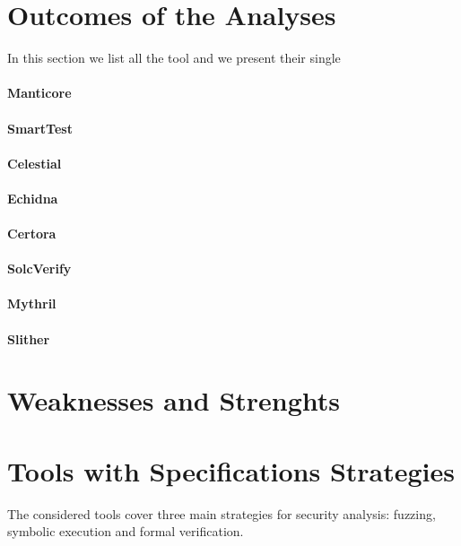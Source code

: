 \section{Outcomes of the Analyses}
In this section we list all the tool and we present their single 


\paragraph{Manticore} 
\paragraph{SmartTest}
\paragraph{Celestial}
\paragraph{Echidna}
\paragraph{Certora}
\paragraph{SolcVerify}
\paragraph{Mythril}
\paragraph{Slither}

\section{Weaknesses and Strenghts}

\section{Tools with Specifications Strategies}
The considered tools cover three main strategies for security analysis: fuzzing, symbolic execution and formal verification. 



